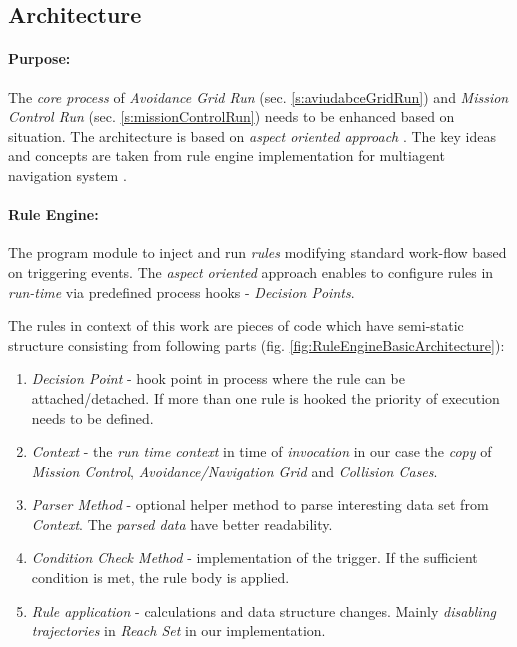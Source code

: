 \subsection{Architecture}\label{s:RuleEngineArchitecture}

\paragraph{Purpose:} The \emph{core process} of \emph{Avoidance Grid Run} (sec. \ref{s:aviudabceGridRun}) and \emph{Mission Control Run} (sec. \ref{s:missionControlRun}) needs to be enhanced based on  situation. The architecture is based on \emph{aspect oriented approach} \cite{hill2003jess}. The key ideas and concepts are taken from rule engine implementation for multiagent  navigation system \cite{seyboth2013event}.

\paragraph{Rule Engine:} The program module to inject and run \emph{rules} modifying standard work-flow based on  triggering events. The \emph{aspect oriented} approach enables to configure rules in \emph{run-time} via predefined process hooks - \emph{Decision Points}. 

The rules in context of this work are pieces of code which have semi-static structure consisting from following parts (fig. \ref{fig:RuleEngineBasicArchitecture}):

\begin{enumerate}
    \item \emph{Decision Point} - hook point in process where the rule can be attached/detached. If more than one rule is hooked the priority of execution needs to be defined. 
    
    \item \emph{Context} - the \emph{run time context} in time of \emph{invocation} in our case the \emph{copy} of \emph{Mission Control}, \emph{Avoidance/Navigation Grid} and \emph{Collision Cases}.
    
    \item \emph{Parser Method} - optional helper method to parse interesting data set from \emph{Context}. The \emph{parsed data} have better readability.
    
    \item \emph{Condition Check Method} - implementation of the trigger. If the sufficient condition is met, the rule body is applied.
    
    \item \emph{Rule application} - calculations and data structure changes. Mainly \emph{disabling trajectories} in \emph{Reach Set} in our implementation.     
\end{enumerate}

